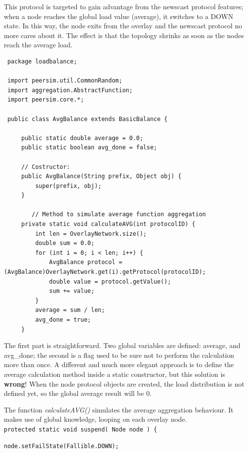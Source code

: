 \documentclass[a4paper,12pt]{article}
\begin{document}
This protocol is targeted to gain advantage from the newscast protocol
features; when a node reaches the global load value (average), it
switches to a DOWN state. In this way, the node exits from the overlay
and the newscast protocol no more cares about it. The effect is that
the topology shrinks as soon as the nodes reach the average load.
\\

\footnotesize
\begin{verbatim}
 package loadbalance;
 
 import peersim.util.CommonRandom;
 import aggregation.AbstractFunction;
 import peersim.core.*;
 
 public class AvgBalance extends BasicBalance {
 
     public static double average = 0.0;
     public static boolean avg_done = false;
     
     // Costructor:
     public AvgBalance(String prefix, Object obj) {
         super(prefix, obj);
     }
 
        // Method to simulate average function aggregation
     private static void calculateAVG(int protocolID) {
         int len = OverlayNetwork.size();
         double sum = 0.0;
         for (int i = 0; i < len; i++) {
             AvgBalance protocol = (AvgBalance)OverlayNetwork.get(i).getProtocol(protocolID);
             double value = protocol.getValue();
             sum += value;
         }
         average = sum / len;
         avg_done = true;
     }
\end{verbatim}
\normalsize


The first part is straightforward. Two global variables are defined:
average, and avg\_done; the second is a flag used to be sure not to
perform the calculation more than once. A different and much more
elegant approach is to define the average calculation method inside
a static constructor, but this solution is \textbf{wrong}! When the
node protocol objects are created, the load distribution is not defined
yet, so the global average result will be 0.

The function \emph{calculateAVG()} simulates the average aggregation
behaviour. It makes use of global knowledge, looping on each overlay
node. \\


\texttt{\footnotesize protected static void suspend( Node node ) \{}{\footnotesize \par}

\texttt{\footnotesize node.setFailState(Fallible.DOWN); }{\footnotesize \par}
\end{document}
